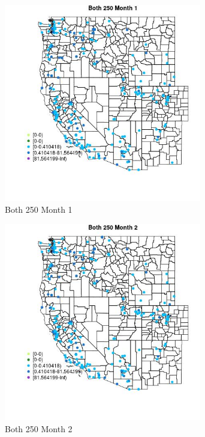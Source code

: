 \begin{figure} 
\centering  
\includegraphics[width=0.77\textwidth]{Code_Outputs/Report_ML_input_PM25_Step4_part_e_de_duplicated_aveswNAs_MapObsMo1Both_250.jpg} 
\caption{\label{fig:Report_ML_input_PM25_Step4_part_e_de_duplicated_aveswNAsMapObsMo1Both_250}Both 250 Month 1} 
\end{figure} 
 

\begin{figure} 
\centering  
\includegraphics[width=0.77\textwidth]{Code_Outputs/Report_ML_input_PM25_Step4_part_e_de_duplicated_aveswNAs_MapObsMo2Both_250.jpg} 
\caption{\label{fig:Report_ML_input_PM25_Step4_part_e_de_duplicated_aveswNAsMapObsMo2Both_250}Both 250 Month 2} 
\end{figure} 
 

